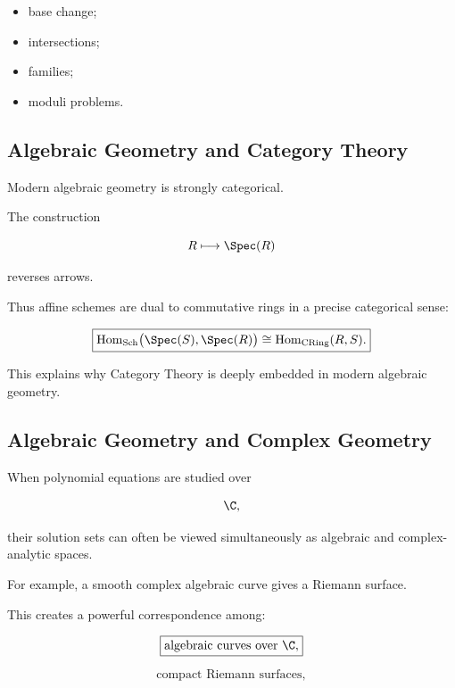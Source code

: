 \begin{itemize}
    \item base change;
    \item intersections;
    \item families;
    \item moduli problems.
\end{itemize}

\subsection{Algebraic Geometry and Category Theory}
\label{subsec:algebraic-geometry-category-theory}

Modern algebraic geometry is strongly categorical.

The construction

\[
R\longmapsto\Spec(R)
\]

reverses arrows.

Thus affine schemes are dual to commutative rings in a precise categorical
sense:

\[
\boxed{
\operatorname{Hom}_{\mathrm{Sch}}
\bigl(
\Spec(S),\Spec(R)
\bigr)
\cong
\operatorname{Hom}_{\mathrm{CRing}}(R,S).
}
\]

This explains why Category Theory is deeply embedded in modern algebraic
geometry.

\subsection{Algebraic Geometry and Complex Geometry}
\label{subsec:algebraic-geometry-complex-geometry}

When polynomial equations are studied over

\[
\C,
\]

their solution sets can often be viewed simultaneously as algebraic and
complex-analytic spaces.

For example, a smooth complex algebraic curve gives a Riemann surface.

This creates a powerful correspondence among:

\[
\boxed{
\text{algebraic curves over }\C,
}
\]

\[
\boxed{
\text{compact Riemann surfaces},
}
\]

